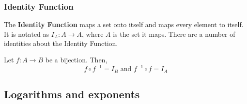 \subsubsection{Identity Function}

The \textbf{Identity Function} maps a set onto itself and maps every element to itself. It is notated as $I_A: A \rightarrow A$,
where $A$ is the set it maps. There are a number of identities about the Identity Function.

Let $f: A \rightarrow B$ be a bijection. Then,
\[
  f \circ f^{-1} = I_B \text{ and } f^{-1} \circ f = I_A
\]

\subsection{Logarithms and exponents}